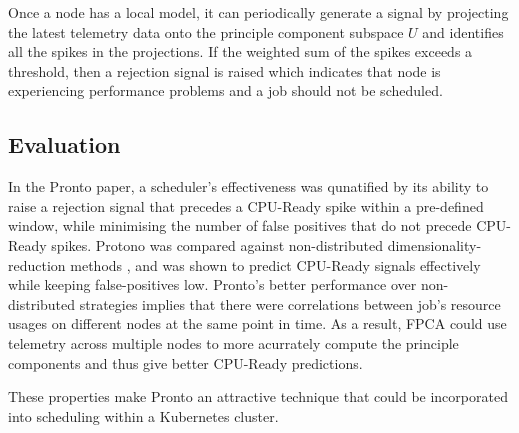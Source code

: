 Once a node has a local model, it can periodically generate a signal by
projecting the latest telemetry data onto the principle component subspace $U$
and identifies all the spikes in the projections. If the weighted sum of the
spikes exceeds a threshold, then a rejection signal is raised which indicates
that node is experiencing performance problems and a job should not be
scheduled.

\subsection{Evaluation}

In the Pronto paper, a scheduler's effectiveness was qunatified by its ability
to raise a rejection signal that precedes a CPU-Ready spike within a pre-defined
window, while minimising the number of false positives that do not precede
CPU-Ready spikes. Protono was compared against non-distributed
dimensionality-reduction methods \cite{}, and was shown to predict CPU-Ready
signals effectively while keeping false-positives low. Pronto's better
performance over non-distributed strategies implies that there were correlations
between job's resource usages on different nodes at the same point in time. As a
result, FPCA could use telemetry across multiple nodes to more acurrately
compute the principle components and thus give better CPU-Ready predictions.

These properties make Pronto an attractive technique that could be incorporated
into scheduling within a Kubernetes cluster.


